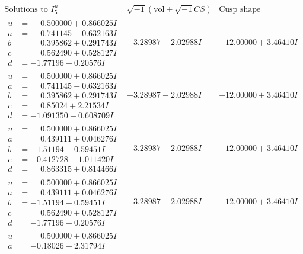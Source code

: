 \documentclass[1p]{elsarticle_modified}
\theoremstyle{definition}
\newcommand{\I}{\sqrt{-1}}
\begin{document}
$$\begin{array}{c|c|c}  
\text{Solutions to }I^u_{5}& \I (\text{vol} + \sqrt{-1}CS) & \text{Cusp shape}\\
 \hline 
\begin{aligned}
u &= \phantom{-}0.500000 + 0.866025 I \\
a &= \phantom{-}0.741145 - 0.632163 I \\
b &= \phantom{-}0.395862 + 0.291743 I \\
c &= \phantom{-}0.562490 + 0.528127 I \\
d &= -1.77196 - 0.20576 I\end{aligned}
 & -3.28987 - 2.02988 I & -12.00000 + 3.46410 I \\ \hline\begin{aligned}
u &= \phantom{-}0.500000 + 0.866025 I \\
a &= \phantom{-}0.741145 - 0.632163 I \\
b &= \phantom{-}0.395862 + 0.291743 I \\
c &= \phantom{-}0.85024 + 2.21534 I \\
d &= -1.091350 - 0.608709 I\end{aligned}
 & -3.28987 - 2.02988 I & -12.00000 + 3.46410 I \\ \hline\begin{aligned}
u &= \phantom{-}0.500000 + 0.866025 I \\
a &= \phantom{-}0.439111 + 0.046276 I \\
b &= -1.51194 + 0.59451 I \\
c &= -0.412728 - 1.011420 I \\
d &= \phantom{-}0.863315 + 0.814466 I\end{aligned}
 & -3.28987 - 2.02988 I & -12.00000 + 3.46410 I \\ \hline\begin{aligned}
u &= \phantom{-}0.500000 + 0.866025 I \\
a &= \phantom{-}0.439111 + 0.046276 I \\
b &= -1.51194 + 0.59451 I \\
c &= \phantom{-}0.562490 + 0.528127 I \\
d &= -1.77196 - 0.20576 I\end{aligned}
 & -3.28987 - 2.02988 I & -12.00000 + 3.46410 I \\ \hline\begin{aligned}
u &= \phantom{-}0.500000 + 0.866025 I \\
a &= -0.18026 + 2.31794 I \\

\end{aligned}
\end{array}$$
\end{document}
